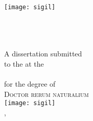 {\setlength{\parindent}{0em}



  
\thispagestyle{empty}
  
\begin{customCenter}
  \Huge\textsf{\mainTitle{}}\\[2mm]%
  \LARGE\textsf{\subTitle{}}\\[13mm]%
  \Large\textsf{\Author{}}\\%
  \vspace*{\fill}
  \texttt{[image: sigil]}\\[13mm]
  \large\textsf{\PlaceOfSubmission{} }
\end{customCenter}
  
\clearpage
	  
	  
\thispagestyle{empty}
	  
\enlargethispage{0.65mm}
	  
\vspace*{\fill}
\begin{customCenter}
  \large\onehalfspacing
  \myCopyrightLarge{} \textsf{ \Author{}}
\end{customCenter}

\clearpage



\thispagestyle{empty}
  
\begin{customCenter}
  \Huge\textsf{\mainTitle{}}\\[2mm]%
  \LARGE\textsf{\subTitle{}}\\[13mm]%
  \Large\textsf{\Author{}}\\%
  \vspace*{\fill}
  \normalsize
  \doublespacing
  	A dissertation submitted\\%
  	to the \Department{} at the\\%
  	\University{}\\%
  	for the degree of\\%
  	\textsc{\large{}Doctor rerum naturalium}\\%
  \singlespacing
  \vspace*{\fill}
  \texttt{[image: sigil]}\\[13mm]%
  \large\textsf{\PlaceOfSubmission{}, }%
\end{customCenter}

}
